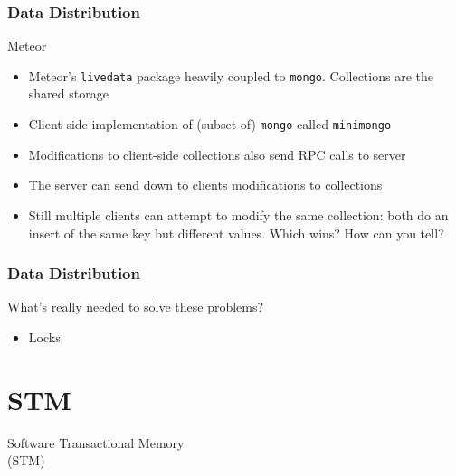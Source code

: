 \documentclass{beamer}
\begin{document}
\begin{frame}
  \frametitle{Data Distribution}

  \begin{block}{Meteor}
    \begin{itemize}
    \item
      Meteor's \texttt{livedata} package heavily coupled to
      \texttt{mongo}. Collections are the shared storage
    \item
      Client-side implementation of (subset of) \texttt{mongo} called
      \texttt{minimongo}
    \item
      Modifications to client-side collections also send RPC calls to
      server
    \item
      The server can send down to clients modifications to collections
    \item
      Still multiple clients can attempt to modify the same
      collection: both do an insert of the same key but different
      values. Which wins? How can you tell?
    \end{itemize}
  \end{block}
\end{frame}

\begin{frame}
  \frametitle{Data Distribution}

  \begin{block}{What's really needed to solve these problems?}
    \begin{itemize}
    \item
      Locks 
    \end{itemize}
  \end{block}
\end{frame}

\section{STM}

\begin{frame}
  \centering
  \LARGE

  Software Transactional Memory\\
  (STM)

\end{frame}
\end{document}
